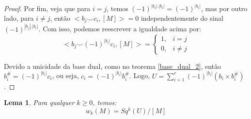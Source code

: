 \documentclass[12pt,oneside]{book} %
\newtheorem{lem}    {\hspace{0.5cm}Lema}[chapter]
\newcommand{\ds}{\displaystyle}
\newcommand{\ccup}{\smile}
\begin{document}
\begin{proof}
	\par Por fim, veja que para $i=j$, temos $(-1)^{|b_{i}|.|b_{i}|}=(-1)^{|b_{i}|}$, mas por outro lado, para $i\neq j$, então $<b_{j}\ccup c_{i},[M]>=0$ independentemente do sinal $(-1)^{|b_{j}|.|b_{i}|}$. Com isso, podemos reescrever a igualdade acima por:
	$$ <b_{j}\ccup (-1)^{|b_{i}|}c_{i},[M]>=\left\{ 
	\begin{array}{rl}
		1, & i=j \\
		0, & i\neq j
	\end{array}
	\right. $$
	
	\par Devido a unicidade da base dual, como no teorema \ref{base_dual_2}, então $b_{i}^{\#}=(-1)^{|b_{i}|}c_{i}$, ou seja, $c_{i}=(-1)^{|b_{i}|}b_{i}^{\#}$. Logo, $U=\ds\sum_{i=1}^{r}(-1)^{|b_{i}|}\left( b_{i}\times b_{i}^{\#} \right)$.
	
\end{proof}

\begin{lem}\label{lema_tecnico_wu}
	Para qualquer $k\geq 0$, temos:
	$$ w_{k}(M)=Sq^{k}(U)/[M] $$
\end{lem}
\end{document}
